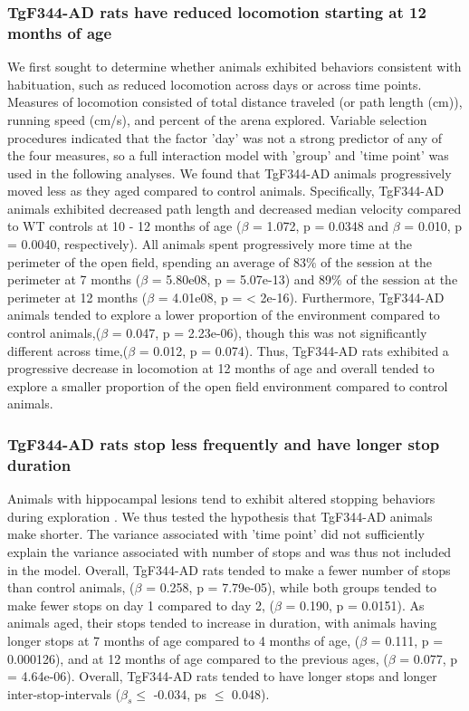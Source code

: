 \documentclass[fleqn,10pt]{wlscirep}
\begin{document}
\subsubsection*{TgF344-AD rats have reduced locomotion starting at 12 months of age}
We first sought to determine whether animals exhibited behaviors consistent with habituation, such as reduced locomotion across days or across time points. Measures of locomotion consisted of total distance traveled (or path length (cm)), running speed (cm/s), and percent of the arena explored. Variable selection procedures indicated that the factor 'day' was not a strong predictor of any of the four measures, so a full interaction model with 'group' and 'time point' was used in the following analyses. We found that TgF344-AD animals progressively moved less as they aged compared to control animals. Specifically, TgF344-AD animals exhibited decreased path length and decreased median velocity compared to WT controls at 10 - 12 months of age ($\beta$ = 1.072, p =  0.0348 and $\beta$ = 0.010, p = 0.0040, respectively). All animals spent progressively more time at the perimeter of the open field, spending an average of 83$\%$ of the session at the perimeter at 7 months ($\beta$ = 5.80e08, p = 5.07e-13)  and 89$\%$ of the session at the perimeter at 12 months ($\beta$ = 4.01e08, p = < 2e-16). Furthermore, TgF344-AD animals tended to explore a lower proportion of the environment compared to control animals,($\beta$ = 0.047, p = 2.23e-06), though this was not significantly different across time,($\beta$ = 0.012, p = 0.074). Thus, TgF344-AD rats exhibited a progressive decrease in locomotion at 12 months of age and overall tended to explore a smaller proportion of the open field environment compared to control animals. 

\subsubsection*{TgF344-AD rats stop less frequently and have longer stop duration}   
Animals with hippocampal lesions tend to exhibit altered stopping behaviors during exploration \citedD{}. We thus tested the hypothesis that TgF344-AD animals make shorter. %
The variance associated with 'time point' did not sufficiently explain the variance associated with number of stops and was thus not included in the model. Overall, TgF344-AD rats tended to make a fewer number of stops than control animals, ($\beta$ = 0.258, p = 7.79e-05), while both groups tended to make fewer stops on day 1 compared to day 2, ($\beta$ = 0.190, p = 0.0151). As animals aged, their stops tended to increase in duration, with animals having longer stops at 7 months of age compared to 4 months of age, ($\beta$ = 0.111, p = 0.000126), and at 12 months of age compared to the previous ages, ($\beta$ = 0.077, p = 4.64e-06). Overall, TgF344-AD rats tended to have longer stops and longer inter-stop-intervals ($\beta_s \leq$ -0.034, ps $\leq$ 0.048). 
\end{document}
